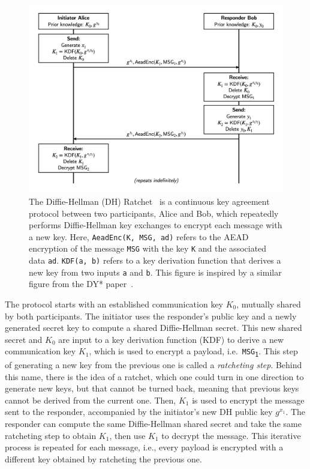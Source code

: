 \begin{figure}
    \centering
    \includegraphics[width=1.0\textwidth]{figures/DH-ratchet.png}
    \caption{The Diffie-Hellman (DH) Ratchet~\cite{perrin2016double} is a continuous key agreement protocol between two participants, Alice and Bob, which repeatedly performs Diffie-Hellman key exchanges to encrypt each message with a new key.
    Here, \texttt{AeadEnc(K, MSG, ad)} refers to the AEAD encryption of the message \texttt{MSG} with the key \texttt{K} and the associated data \texttt{ad}. \texttt{KDF(a, b)} refers to a key derivation function that derives a new key from two inputs \texttt{a} and \texttt{b}.
    This figure is inspired by a similar figure from the DY* paper~\cite{bhargavan2021text}.}
    \label{fig:dh-ratchet}
\end{figure}

The protocol starts with an established communication key $K_0$, mutually shared by both participants.
The initiator uses the responder's public key and a newly generated secret key to compute a shared Diffie-Hellman secret.
This new shared secret and $K_0$ are input to a key derivation function (KDF) to derive a new communication key $K_1$, which is used to encrypt a payload, i.e.\ \texttt{MSG\textsubscript{1}}.
This step of generating a new key from the previous one is called a \emph{ratcheting step}.
Behind this name, there is the idea of a ratchet, which one could turn in one direction to generate new keys, but that cannot be turned back, meaning that previous keys cannot be derived from the current one.
Then, $K_1$ is used to encrypt the message sent to the responder, accompanied by the initiator's new DH public key $g^{x_1}$.
The responder can compute the same Diffie-Hellman shared secret and take the same ratcheting step to obtain $K_1$, then use $K_1$ to decrypt the message.
This iterative process is repeated for each message, i.e., every payload is encrypted with a different key obtained by ratcheting the previous one.

